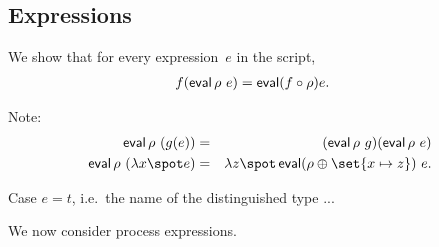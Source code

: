 
\subsection{Expressions}

We show that for every expression~$e$ in the script,
\begin{eqnarray*}
f(\mathop{\sf eval} \rho ~ e) & = \mathop{\sf eval} (f \circ \rho) e .
\end{eqnarray*}

\framebox{\ldots}

Note:
\begin{eqnarray*}
\eval \rho ~(g(e)) & = & (\eval \rho ~g) (\eval \rho~ e) \\
\eval \rho ~(\lambda x \spot e) & = & 
  \lambda z \spot \eval (\rho \oplus \set{x \mapsto z})~ e.
\end{eqnarray*}


Case $e = t$, i.e.~the name of the distinguished type ...


We now consider process expressions.

